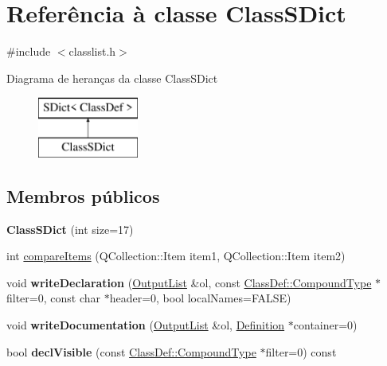 \hypertarget{class_class_s_dict}{\section{Referência à classe Class\-S\-Dict}
\label{class_class_s_dict}
}


{\ttfamily \#include $<$classlist.\-h$>$}

Diagrama de heranças da classe Class\-S\-Dict\begin{figure}[H]
\begin{center}
\leavevmode
\includegraphics[height=2.000000cm]{class_class_s_dict}
\end{center}
\end{figure}
\subsection*{Membros públicos}
\begin{DoxyCompactItemize}
\item 
\hypertarget{class_class_s_dict_ac1cfb57e5f4badc70919dc2cd056b8d3}{{\bfseries Class\-S\-Dict} (int size=17)}\label{class_class_s_dict_ac1cfb57e5f4badc70919dc2cd056b8d3}

\item 
int \hyperlink{class_class_s_dict_a219450accf048597ffc7113ecde4c402}{compare\-Items} (Q\-Collection\-::\-Item item1, Q\-Collection\-::\-Item item2)
\item 
\hypertarget{class_class_s_dict_aa8443734095451ad529ee10b81f1f349}{void {\bfseries write\-Declaration} (\hyperlink{class_output_list}{Output\-List} \&ol, const \hyperlink{class_class_def_a768a6f0a6fd7e9087ff7971abbcc3f36}{Class\-Def\-::\-Compound\-Type} $\ast$filter=0, const char $\ast$header=0, bool local\-Names=F\-A\-L\-S\-E)}\label{class_class_s_dict_aa8443734095451ad529ee10b81f1f349}

\item 
\hypertarget{class_class_s_dict_afca5f10ff8e8cb05238e68c8914c524b}{void {\bfseries write\-Documentation} (\hyperlink{class_output_list}{Output\-List} \&ol, \hyperlink{class_definition}{Definition} $\ast$container=0)}\label{class_class_s_dict_afca5f10ff8e8cb05238e68c8914c524b}

\item 
\hypertarget{class_class_s_dict_a641567e9a1d7e66e7ca033f43221f3ec}{bool {\bfseries decl\-Visible} (const \hyperlink{class_class_def_a768a6f0a6fd7e9087ff7971abbcc3f36}{Class\-Def\-::\-Compound\-Type} $\ast$filter=0) const }\label{class_class_s_dict_a641567e9a1d7e66e7ca033f43221f3ec}

\end{DoxyCompactItemize}


